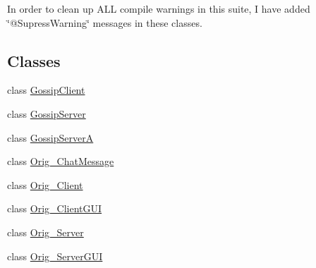 In order to clean up A\-L\-L compile warnings in this suite, I have added \char`\"{}@\-Supress\-Warning\char`\"{} messages in these classes. \subsection*{Classes}
\begin{DoxyCompactItemize}
\item 
class \hyperlink{classgov_1_1fnal_1_1ppd_1_1dd_1_1chat_1_1original_1_1GossipClient}{Gossip\-Client}
\item 
class \hyperlink{classgov_1_1fnal_1_1ppd_1_1dd_1_1chat_1_1original_1_1GossipServer}{Gossip\-Server}
\item 
class \hyperlink{classgov_1_1fnal_1_1ppd_1_1dd_1_1chat_1_1original_1_1GossipServerA}{Gossip\-Server\-A}
\item 
class \hyperlink{classgov_1_1fnal_1_1ppd_1_1dd_1_1chat_1_1original_1_1Orig__ChatMessage}{Orig\-\_\-\-Chat\-Message}
\item 
class \hyperlink{classgov_1_1fnal_1_1ppd_1_1dd_1_1chat_1_1original_1_1Orig__Client}{Orig\-\_\-\-Client}
\item 
class \hyperlink{classgov_1_1fnal_1_1ppd_1_1dd_1_1chat_1_1original_1_1Orig__ClientGUI}{Orig\-\_\-\-Client\-G\-U\-I}
\item 
class \hyperlink{classgov_1_1fnal_1_1ppd_1_1dd_1_1chat_1_1original_1_1Orig__Server}{Orig\-\_\-\-Server}
\item 
class \hyperlink{classgov_1_1fnal_1_1ppd_1_1dd_1_1chat_1_1original_1_1Orig__ServerGUI}{Orig\-\_\-\-Server\-G\-U\-I}
\end{DoxyCompactItemize}

